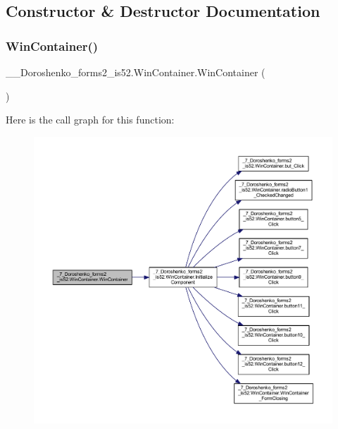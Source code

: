 \subsection{Constructor \& Destructor Documentation}
\hypertarget{class__7___doroshenko__forms2__is52_1_1_win_container_a43e1e879487706ee2d3fdf336598b566}{}\label{class__7___doroshenko__forms2__is52_1_1_win_container_a43e1e879487706ee2d3fdf336598b566} 
\subsubsection{\texorpdfstring{Win\+Container()}{WinContainer()}}
{\footnotesize\ttfamily \+\_\+\_\+\+Doroshenko\+\_\+forms2\+\_\+is52.\+Win\+Container.\+Win\+Container (\begin{DoxyParamCaption}{ }\end{DoxyParamCaption})}

Here is the call graph for this function\+:
\nopagebreak
\begin{figure}[H]
\begin{center}
\leavevmode
\includegraphics[width=350pt]{class__7___doroshenko__forms2__is52_1_1_win_container_a43e1e879487706ee2d3fdf336598b566_cgraph}
\end{center}
\end{figure}


